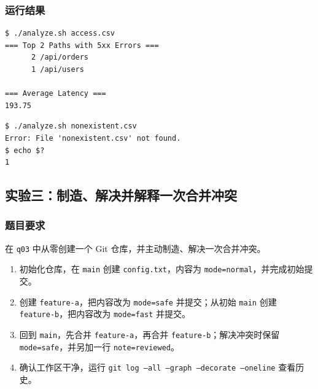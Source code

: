 \documentclass[12pt,a4paper]{article}
\begin{document}
\subsubsection{运行结果}
\begin{lstlisting}[caption={正常文件运行结果}]
$ ./analyze.sh access.csv
=== Top 2 Paths with 5xx Errors ===
      2 /api/orders
      1 /api/users

=== Average Latency ===
193.75
\end{lstlisting}

\begin{lstlisting}[caption={异常文件运行结果}]
$ ./analyze.sh nonexistent.csv
Error: File 'nonexistent.csv' not found.
$ echo $?
1
\end{lstlisting}

\newpage
\subsection{实验三：制造、解决并解释一次合并冲突}

\subsubsection{题目要求}
在 \texttt{q03} 中从零创建一个 Git 仓库，并主动制造、解决一次合并冲突。
\begin{enumerate}[leftmargin=2em]
    \item 初始化仓库，在 \texttt{main} 创建 \texttt{config.txt}，内容为 \texttt{mode=normal}，并完成初始提交。
    \item 创建 \texttt{feature-a}，把内容改为 \texttt{mode=safe} 并提交；从初始 \texttt{main} 创建 \texttt{feature-b}，把内容改为 \texttt{mode=fast} 并提交。
    \item 回到 \texttt{main}，先合并 \texttt{feature-a}，再合并 \texttt{feature-b}；解决冲突时保留 \texttt{mode=safe}，并另加一行 \texttt{note=reviewed}。
    \item 确认工作区干净，运行 \texttt{git log --all --graph --decorate --oneline} 查看历史。
\end{enumerate}
\end{document}
